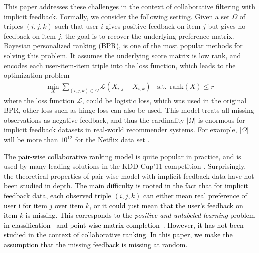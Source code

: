 \documentclass[conference]{IEEEtran}
\numberwithin{equation}{section}
\newcommand{\laks}[1]{\textcolor{black}{#1}}
\newtheorem{sampling strategy}{Sampling Strategy}
\begin{document}
This paper addresses these challenges in the context of collaborative filtering with implicit feedback. Formally, we consider the following setting. Given
a set $\Omega$ of triples $(i,j,k)$ such that user $i$ gives positive feedback on item $j$ but gives no feedback on item $j$,
the goal is to recover the underlying preference matrix. 
Bayesian personalized ranking (BPR),  \cite{bpr} is one of the most popular methods for solving this problem. It assumes the underlying score matrix is low rank, and encodes each user-item-item triple into the loss function, which leads to the optimization problem
\begin{equation*}
    \begin{array}{ll}
       \displaystyle \min_X  \sum_{(i,j,k) \in \Omega} \mathcal{L}( {X}_{i,j} - {X}_{i,k} ) ~~~~ \text{s.t.}~~  \text{rank}(X) \leq r
    \end{array}
\end{equation*}
where the loss function $\mathcal{L}$, could be logistic loss, which was used in the original BPR, other loss such as hinge loss can also be used.
This model treats all missing observations as negative feedback, and thus the cardinality $|\Omega|$ is enormous for implicit feedback datasets in real-world recommender systems. For example, $|\Omega|$ will be more than {$10^{12}$} for the Netflix data set \cite{netflix}. 

The \laks{pair-wise collaborative ranking model} is quite popular in practice, and is used by many leading solutions in the KDD-Cup'11 competition \cite{yahoo!}. Surprisingly, the theoretical properties of pair-wise model with implicit feedback data have  not been  studied in depth. \laks{The main difficulty is rooted in the fact that for implicit feedback data, each observed triple $(i, j, k)$ can either mean  real  preference of user i for item $j$ over item $k$, or it could just mean that the user's feedback on item $k$ is missing. This corresponds to the \textit{positive and unlabeled learning} problem in classification~\cite{elkan2008learning} and point-wise matrix completion~\cite{hsieh2015pu}. However, it has not been studied in the context of collaborative ranking. In this paper, we make the assumption that the missing feedback is missing at random.} 
\end{document}

